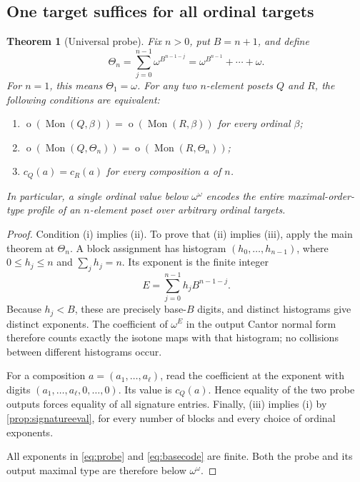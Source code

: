 \documentclass[11pt,a4paper]{article}
\newtheorem{theorem}{Theorem}[section]
\theoremstyle{definition}
\theoremstyle{remark}
\newcommand{\Mon}{\operatorname{Mon}}
\newcommand{\otype}{\operatorname{o}}
\begin{document}
\subsection{One target suffices for all ordinal targets}
\begin{theorem}[Universal probe]\label{thm:probe}
Fix $n>0$, put $B=n+1$, and define
\begin{equation}\label{eq:probe}
 \Theta_n=\sum_{j=0}^{n-1}\omega^{B^{n-1-j}}
 =\omega^{B^{n-1}}+\cdots+\omega.
\end{equation}
For $n=1$, this means $\Theta_1=\omega$. For any two $n$-element posets
$Q$ and $R$, the following conditions are equivalent:
\begin{enumerate}[label=\textup{(\roman*)},leftmargin=2.3em]
\item $\otype(\Mon(Q,\beta))=\otype(\Mon(R,\beta))$ for every ordinal $\beta$;
\item $\otype(\Mon(Q,\Theta_n))=\otype(\Mon(R,\Theta_n))$;
\item $c_Q(a)=c_R(a)$ for every composition $a$ of $n$.
\end{enumerate}
In particular, a single ordinal value below $\omega^\omega$ encodes the
entire maximal-order-type profile of an $n$-element poset over arbitrary
ordinal targets.
\end{theorem}
\begin{proof}
Condition (i) implies (ii). To prove that (ii) implies (iii), apply the
main theorem at $\Theta_n$. A block assignment has histogram
$(h_0,\ldots,h_{n-1})$, where $0\leq h_j\leq n$ and $\sum_j h_j=n$.
Its exponent is the finite integer
\begin{equation}\label{eq:basecode}
 E=\sum_{j=0}^{n-1}h_jB^{n-1-j}.
\end{equation}
Because $h_j<B$, these are precisely base-$B$ digits, and distinct
histograms give distinct exponents. The coefficient of $\omega^E$ in
the output Cantor normal form therefore counts exactly the isotone maps
with that histogram; no collisions between different histograms occur.

For a composition $a=(a_1,\ldots,a_\ell)$, read the coefficient at the
exponent with digits
$(a_1,\ldots,a_\ell,0,\ldots,0)$. Its value is $c_Q(a)$. Hence equality
of the two probe outputs forces equality of all signature entries.
Finally, (iii) implies (i) by \cref{prop:signatureeval}, for every number
of blocks and every choice of ordinal exponents.

All exponents in \eqref{eq:probe} and \eqref{eq:basecode} are finite.
Both the probe and its output maximal type are therefore below
$\omega^\omega$.
\end{proof}
\end{document}
